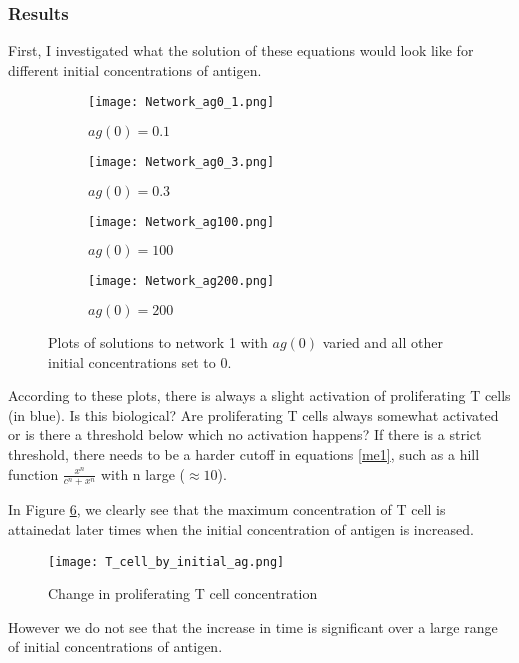 \subsubsection{\label{sec:res1}Results}

First, I investigated what the solution of these equations would look like for different initial concentrations of antigen.
\begin{widetext}

\begin{figure}
\begin{subfigure}{.4\textwidth}
  \centering
  \texttt{[image: Network\_ag0\_1.png]}
  \caption{$ag(0)=0.1$}
  \label{fig:sfig1}
\end{subfigure}%
\begin{subfigure}{.4\textwidth}
  \centering
  \texttt{[image: Network\_ag0\_3.png]}
  \caption{$ag(0)=0.3$}
  \label{fig:sfig2}
\end{subfigure}
\begin{subfigure}{.4\textwidth}
  \centering
  \texttt{[image: Network\_ag100.png]}
  \caption{$ag(0)=100$}
  \label{fig:sfig3}
\end{subfigure}%
\begin{subfigure}{.4\textwidth}
  \centering
  \texttt{[image: Network\_ag200.png]}
  \caption{$ag(0)=200$}
  \label{fig:sfig4}
\end{subfigure}

\caption{Plots of solutions to network 1 with $ag(0)$ varied and all other initial concentrations set to 0.}
\label{fig:fig}
\end{figure}
\end{widetext}

According to these plots, there is always a slight activation of proliferating T cells (in blue). Is this biological? Are proliferating T cells always somewhat activated or is there a threshold below which no activation happens? If there is a strict threshold, there needs to be a harder cutoff in equations \ref{me1}, such as a hill function $\frac{x^n}{c^n+x^n}$ with n large ($\approx 10$).

In Figure \ref{vary_init_ag}, we clearly see that the maximum concentration of T cell is attainedat later times when the initial concentration of antigen is increased.

\begin{figure}[ht!]
	\centering
  	\texttt{[image: T\_cell\_by\_initial\_ag.png]}
  	\caption{Change in proliferating T cell concentration}
  	\label{vary_init_ag}
\end{figure}

However we do not see that the increase in time is significant over a large range of initial concentrations of antigen. 
